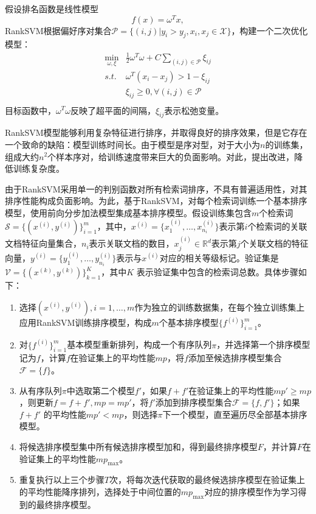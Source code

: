 假设排名函数是线性模型
\[
    f(x) = \omega^T x,
\]
RankSVM根据偏好序对集合$\mathscr P = \{(i,j)| y_i > y_j, x_i,x_j \in \mathcal{X}\}$，构建一个二次优化模型：
\begin{equation}\label{eq:ranksvm}
  \begin{array}{ll}
    \min \limits_{\omega,\xi} & \frac{1}{2}\omega^T\omega + C\sum\limits_{(i,j)\in \mathscr P} \xi_{ij}\\
    \textit{s.t.}& \omega^T(x_i - x_j) > 1- \xi_{ij}\\
    & \xi_{ij} \ge 0,\forall (i,j)\in \mathscr P\\
  \end{array}
\end{equation}
目标函数中，$\omega^T\omega$反映了超平面的间隔，$\xi_{ij}$表示松弛变量。

RankSVM模型能够利用复杂特征进行排序，并取得良好的排序效果，但是它存在一个致命的缺陷：模型训练时间长。由于模型是序对型，对于大小为$n$的训练集，组成大约$n^2$个样本序对，给训练速度带来巨大的负面影响。对此，\cite{joachims2006training,airola2011training}提出改进，降低训练复杂度。

由于RankSVM采用单一的判别函数对所有检索词排序，不具有普遍适用性，对其排序性能构成负面影响。为此，\cite{jung2011ensemble}基于RankSVM，对每个检索词训练一个基本排序模型，使用前向分步加法模型集成基本排序模型。假设训练集包含$m$个检索词$\mathcal{S} = \{(x^{(i)}, y^{(i)})\}_{i = 1}^m$，其中，$x^{(i)} = \{x_1^{(i)},\ldots, x_{n_i}^{(i)}\}$表示第$i$个检索词的关联文档特征向量集合，$n_i$表示关联文档的数目，$x_j^{(i)}\in \mathbb R^d$表示第$j$个关联文档的特征向量，$y^{(i)} = \{y_1^{(i)},\ldots, y_{n_i}^{(i)}\}$表示与$x^{(i)}$对应的相关等级标记。验证集是$\mathcal{V} = \{(x^{(k)}, y^{(k)})\}_{k = 1}^K$，其中$K$ 表示验证集中包含的检索词总数。具体步骤如下：
\begin{enumerate}[（1）]
  \item 选择$(x^{(i)}, y^{(i)}), i = 1,\ldots, m$作为独立的训练数据集，在每个独立训练集上应用RankSVM训练排序模型，构成$m$个基本排序模型$\{f^{(i)}\}_{i = 1}^m$。
  \item 对$\{f^{(i)}\}_{i = 1}^m$基本模型重新排列，构成一个有序队列$\pi$，并选择第一个排序模型记为$f$，计算$f$在验证集上的平均性能$mp$，将$f$添加至候选排序模型集合$\mathcal{F} = \{f\}$。
  \item 从有序队列$\pi$中选取第二个模型$f'$，如果$f + f'$在验证集上的平均性能$mp' \ge mp$，则更新$f = f + f', mp = mp'$，将$f'$添加到排序模型集合$\mathcal{F} = \{f, f'\}$；如果$f + f'$ 的平均性能$mp' < mp$，则选择$\pi$下一个模型，直至遍历尽全部基本排序模型。
  \item 将候选排序模型集中所有候选排序模型加和，得到最终排序模型$F$，并计算$F$在验证集上的平均性能$mp_{\max}$。
  \item 重复执行以上三个步骤$T$次，将每次迭代获取的最终候选排序模型在验证集上的平均性能降序排列，选择处于中间位置的$mp_{\max}$对应的排序模型作为学习得到的最终排序模型。
\end{enumerate}


